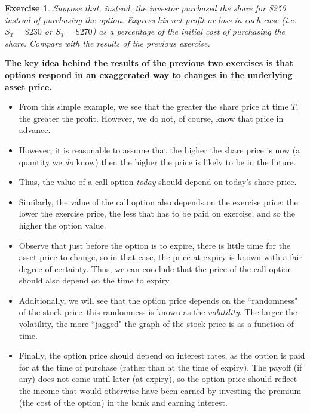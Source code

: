 \documentclass[letterpaper,10pt]{article}
\newtheorem{ex}{Exercise}
\begin{document}
\begin{ex}
Suppose that, instead, the investor purchased the share for \$250 instead of purchasing the option.  Express his net profit or loss in each case (i.e. $S_T=\$230$ or $S_T=\$270$) as a percentage of the initial cost of purchasing the share.  Compare with the results of the previous exercise.
\end{ex}  
%
\begin{center} {\bf The key idea behind the results of the previous two exercises is that options respond in an exaggerated way to changes in the underlying asset price.}
\end{center}

\begin{itemize}

\item From this simple example, we see that the greater the share price at time $T$, the greater the profit.  However, we do not, of course, know that price in advance.  

\item However, it is reasonable to assume that the higher the share price is now (a quantity we {\em do} know) then the higher the price is likely to be in the future.  

\item Thus, the value of a call option {\em today} should depend on today's share price.  

\item Similarly, the value of the call option also depends on the exercise price:  the lower the exercise price, the less that has to be paid on exercise, and so the higher the option value.  

\item Observe that just before the option is to expire, there is little time for the asset price to change, so in that case, the price at expiry is known with a fair degree of certainty.  Thus, we can conclude that the price of the call option should also depend on the time to expiry.

\item Additionally, we will see that the option price depends on the ``randomness" of the stock price--this randomness is known as the {\em volatility}.  The larger the volatility, the more ``jagged" the graph of the stock price is as a function of time.  

\item Finally, the option price should depend on interest rates, as the option is paid for at the time of purchase (rather than at the time of expiry).  The payoff (if any) does not come until later (at expiry), so the option price should reflect the income that would otherwise have been earned by investing the premium (the cost of the option) in the bank and earning interest.  

\end{itemize}
\end{document}

